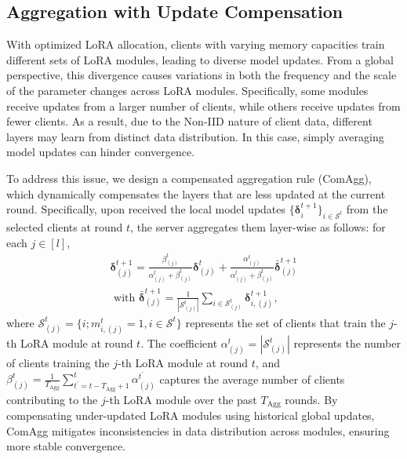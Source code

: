 \documentclass[sigconf]{acmart}
\begin{document}


\subsection{Aggregation with Update Compensation}\label{subsec:HAgg}

With optimized LoRA allocation, clients with varying memory capacities train different sets of LoRA modules, leading to diverse model updates. From a global perspective, this divergence causes variations in both the frequency and the {scale} of the parameter changes across LoRA modules. Specifically, some modules receive updates from a larger number of clients, while others receive updates from fewer clients. As a result, due to the Non-IID nature of client data, different layers may learn from distinct data distribution. In this case, simply averaging model updates can hinder convergence. 

To address this issue, we design a compensated aggregation rule ({ComAgg}), which dynamically compensates the layers that are less updated at the current round. Specifically, upon received the local model updates $\{\boldsymbol{\delta}_i^{t+1}\}_{i\in \mathcal{S}^t}$ from the selected clients at round $t$, the server aggregates them layer-wise as follows: for each $j\in[l]$,
\begin{align}\label{eq:agg_temporal}
    {\boldsymbol{\delta}}_{(j)}^{t+1} =  \frac{\beta_{(j)}^t}{\alpha_{(j)}^t+\beta_{(j)}^t}\boldsymbol{\delta}_{(j)}^{t} + \frac{\alpha_{(j)}^t}{\alpha_{(j)}^t+\beta_{(j)}^t} \bar{\boldsymbol{\delta}}_{(j)}^{t+1} \nonumber\\
    \text{ with } \bar{\boldsymbol{\delta}}_{(j)}^{t+1} = \frac{1}{|\mathcal{S}_{(j)}^t|} \sum_{i \in \mathcal{S}_{(j)}^t} {\boldsymbol{\delta}}_{i, (j)}^{t+1},
\end{align}
where $\mathcal{S}_{(j)}^t = \{i; m_{i, (j)}^t=1, i\in \mathcal{S}^t\}$ represents the set of clients that train the $j$-th LoRA module at round $t$. The coefficient $\alpha_{(j)}^t=|\mathcal{S}_{(j)}^t|$ represents the number of clients training the $j$-th LoRA module at round $t$, and $\beta_{(j)}^t=\frac{1}{ T_{\text{Agg}}} \sum_{t^\prime = t - T_{\text{Agg}} + 1}^{t} \alpha_{(j)}^{t^\prime}$ captures the average number of clients contributing to the $j$-th LoRA module over the past $T_{\text{Agg}}$ rounds. By compensating under-updated LoRA modules using historical global updates, ComAgg mitigates inconsistencies in data distribution across modules, ensuring more stable convergence.
\end{document}
